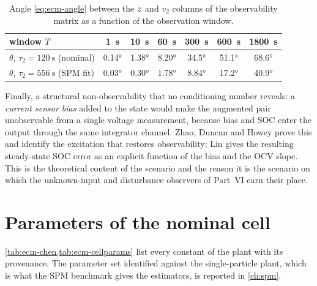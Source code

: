 \begin{table}[H]\centering
\caption{Angle \eqref{eq:ecm-angle} between the $z$ and $v_2$ columns of the observability
matrix as a function of the observation window.}
\label{tab:ecm-angle}
\begin{tabular}{lcccccc}\toprule
window $T$ & \SI{1}{\second} & \SI{10}{\second} & \SI{60}{\second} & \SI{300}{\second} & \SI{600}{\second} & \SI{1800}{\second}\\ \midrule
$\theta$, $\tau_2=\SI{120}{\second}$ (nominal)  & \ang{0.14} & \ang{1.38} & \ang{8.20} & \ang{34.5} & \ang{51.1} & \ang{68.6}\\
$\theta$, $\tau_2=\SI{556}{\second}$ (SPM fit)  & \ang{0.03} & \ang{0.30} & \ang{1.78} & \ang{8.84} & \ang{17.2} & \ang{40.9}\\
\bottomrule\end{tabular}
\end{table}

Finally, a structural non-observability that no conditioning number reveals: a \emph{current
sensor bias} added to the state would make the augmented pair unobservable from a single voltage
measurement, because bias and SOC enter the output through the same integrator channel. Zhao,
Duncan and Howey \cite{zhao2017observability} prove this and identify the excitation that
restores observability; Lin \cite{lin2018sensorbias} gives the resulting steady-state SOC error
as an explicit function of the bias and the OCV slope. This is the theoretical content of the
 scenario and the reason it is the scenario on which the unknown-input and
disturbance observers of Part~VI earn their place.

\section{Parameters of the nominal cell}
\label{sec:ecm-params}

\cref{tab:ecm-chen,tab:ecm-cellparams} list every constant of the plant with its provenance. The
parameter set identified against the single-particle plant, which is what the SPM benchmark gives
the estimators, is reported in \cref{ch:spm}.

